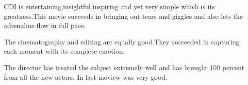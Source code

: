 \documentclass[]{article}
\begin{document}
CDI is entertaining,insightful,inspiring and yet very simple which is its greatness.This movie succeeds in bringing out tears and giggles and also lets the adrenaline flow in full pace.

The cinematography and editing are equally good.They succeeded in capturing each moment with its complete emotion.

The director has treated the subject extremely well and has brought 100 percent from all the new actors.
In last moview was very good.
\end{document}
